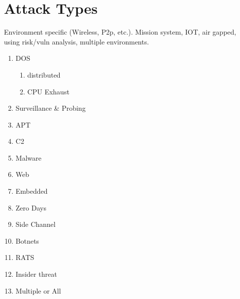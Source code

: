 \documentclass[conference]{IEEEtran}
\begin{document}
\section{Attack Types}
Environment specific (Wireless, P2p, etc.). Mission system, IOT, air gapped, using risk/vuln analysis, multiple environments. \cite{lazarevic2005intrusion}\cite{mitchell2014survey}\cite{axelsson2000intrusion}
\begin{enumerate}
    \item DOS \cite{zargar2013survey}\cite{warrender1999detecting}\cite{lee1999data}
    \begin{enumerate}
        \item distributed
        \item CPU Exhaust
    \end{enumerate}
    \item Surveillance \& Probing \cite{lazarevic2005intrusion}
    \item APT\cite{jasek2013apt}\cite{saud2015towards}\cite{kim2013detection}
    \item C2 \cite{chen2014study}\cite{jasek2013apt}\cite{bhatt2014towards}
    \item Malware\cite{gabriel2009analyzing}\cite{tankard2011advanced}
        \item Web
    \item Embedded
    \item Zero Days\cite{kotenko2012common}\cite{chen2014study}\cite{jeun2012practical}
    \item Side Channel
    \item Botnets\cite{singh2014big}\cite{awad2017network}
    \item RATS\cite{wu2017detecting}
    \item Insider threat\cite{mukherjee1994network}
    \item Multiple or All
\end{enumerate}
\end{document}
